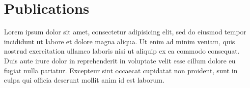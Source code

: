 \documentclass[11pt,a4paper,sans]{moderncv}
\begin{document}
\clearpage
\maketitle{}

\section{Publications}






\clearpage

Lorem ipsum dolor sit amet, consectetur adipisicing elit, sed do eiusmod tempor incididunt ut labore et dolore magna aliqua. Ut enim ad minim veniam, quis nostrud exercitation ullamco laboris nisi ut aliquip ex ea commodo consequat. Duis aute irure dolor in reprehenderit in voluptate velit esse cillum dolore eu fugiat nulla pariatur. Excepteur sint occaecat cupidatat non proident, sunt in culpa qui officia deserunt mollit anim id est laborum.
\end{document}
